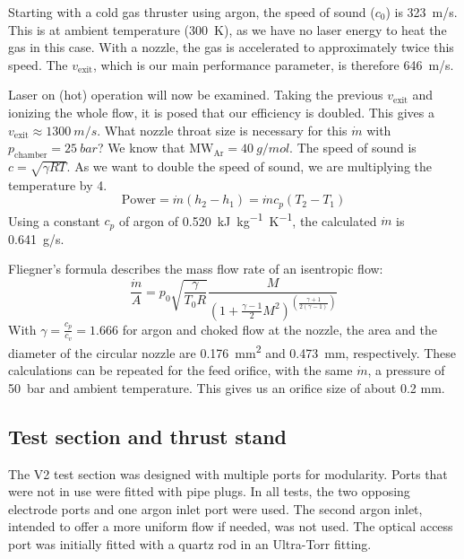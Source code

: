             Starting with a cold gas thruster using argon, the speed of sound ($c_0$) is \qty{323}{m/s}. This is at ambient temperature (\qty{300}{K}), as we have no laser energy to heat the gas in this case. With a nozzle, the gas is accelerated to approximately twice this speed. The $v_\mathrm{exit}$, which is our main performance parameter, is therefore \qty{646}{m/s}.
            
            Laser on (hot) operation will now be examined. Taking the previous $v_\mathrm{exit}$ and ionizing the whole flow, it is posed that our efficiency is doubled. This gives a $v_\mathrm{exit}\approx \qty{1300}{m/s}$. What nozzle throat size is necessary for this $\dot m$ with $p_\mathrm{chamber} = \qty{25}{bar}$? We know that $\mathrm{MW_{Ar}} = \qty{40}{g/mol}$. The speed of sound is $c = \sqrt{\gamma R T}$. As we want to double the speed of sound, we are multiplying the temperature by 4.
            \[\text{Power} = \dot m (h_2-h_1)
            = \dot m c_p (T_2-T_1)\]
            Using a constant $c_p$ of argon of \qty{0.520}{kJ.kg^{-1}.K^{-1}}, the calculated $\dot m$ is \qty{0.641}{g/s}.
            
            Fliegner's formula describes the mass flow rate of an isentropic flow:
            \[\frac{\dot m}{A} = p_0\sqrt{\frac{\gamma}{T_0 R}}\frac{M}{(1+\frac{\gamma-1}{2}M^2)^{(\frac{\gamma+1}{2(\gamma-1)})}}\]
            With $\gamma = \frac{c_p}{c_v} = 1.666$ for argon and choked flow at the nozzle, the area and the diameter of the circular nozzle are \qty{0.176}{mm^2} and \qty{0.473}{mm}, respectively. These calculations can be repeated for the feed orifice, with the same $\dot m$, a pressure of \qty{50}{bar} and ambient temperature. This gives us an orifice size of about 0.2 mm.
        
        \subsection{Test section and thrust stand}
            
            The V2 test section was designed with multiple ports for modularity. Ports that were not in use were fitted with pipe plugs. In all tests, the two opposing electrode ports and one argon inlet port were used. The second argon inlet, intended to offer a more uniform flow if needed, was not used. The optical access port was initially fitted with a quartz rod in an Ultra-Torr fitting.

